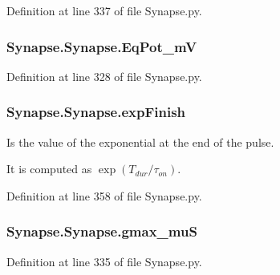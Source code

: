 Definition at line 337 of file Synapse.\+py.

\subsubsection[{\texorpdfstring{Eq\+Pot\+\_\+mV}{EqPot_mV}}]{\setlength{\rightskip}{0pt plus 5cm}Synapse.\+Synapse.\+Eq\+Pot\+\_\+mV}\hypertarget{class_synapse_1_1_synapse_adc80e9a62c17b29a92c2e7a0413e572d}{}\label{class_synapse_1_1_synapse_adc80e9a62c17b29a92c2e7a0413e572d}


Definition at line 328 of file Synapse.\+py.

\subsubsection[{\texorpdfstring{exp\+Finish}{expFinish}}]{\setlength{\rightskip}{0pt plus 5cm}Synapse.\+Synapse.\+exp\+Finish}\hypertarget{class_synapse_1_1_synapse_aa9ae256b272ceb8e9e4a931a9cd5d163}{}\label{class_synapse_1_1_synapse_aa9ae256b272ceb8e9e4a931a9cd5d163}


Is the value of the exponential at the end of the pulse. 

It is computed as $\exp(T_{dur}/\tau_{on})$. 

Definition at line 358 of file Synapse.\+py.

\subsubsection[{\texorpdfstring{gmax\+\_\+muS}{gmax_muS}}]{\setlength{\rightskip}{0pt plus 5cm}Synapse.\+Synapse.\+gmax\+\_\+muS}\hypertarget{class_synapse_1_1_synapse_a7922dac4765183cb6052905cc0d251cb}{}\label{class_synapse_1_1_synapse_a7922dac4765183cb6052905cc0d251cb}


Definition at line 335 of file Synapse.\+py.

